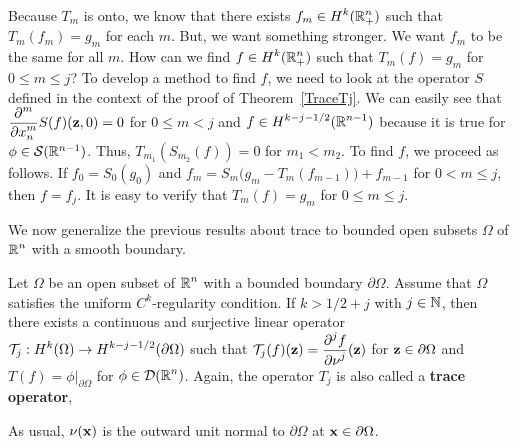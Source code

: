 Because $T_m$ is onto, we know that there exists
$\displaystyle f_m \in H^k(\RR^n_+)$ such that $\displaystyle T_m(f_m) = g_m$
for each $m$.  But, we want something stronger.  We want $f_m$ to be
the same for all $m$.  How can we find $\displaystyle f \in H^k(\RR^n_+)$ such
that $\displaystyle T_m(f) = g_m$ for $0 \leq m \leq j$?  To develop a
method to find $f$, we need to look at the operator $S$ defined in the
context of the proof of Theorem~\ref{TraceTj}.  We can easily see that
$\displaystyle \pdfdxn{S(f)}{x_n}{m}(\VEC{z},0) = 0$ for $0 \leq m < j$
and $\displaystyle f \in H^{k-j-1/2}(\RR^{n-1})$ because it is true
for $\phi \in \SS(\RR^{n-1})$.
Thus, $T_{m_1}(S_{m_2}(f)) = 0$ for $m_1 < m_2$.  To find $f$, we
proceed as follows. If $f_0 = S_0(g_0)$ and
$f_m = S_m\big(g_m - T_m(f_{m-1})\big) + f_{m-1}$ for $0 < m \leq j$,
then $f = f_j$.  It is easy to verify that $T_m(f) = g_m$ for
$0 \leq m \leq j$.

We now generalize the previous results about trace to bounded open
subsets $\Omega$ of $\displaystyle \RR^n$ with a smooth boundary.

\begin{theorem} \label{TraceTjOmega}
Let $\Omega$ be an open subset of $\displaystyle \RR^n$ with a bounded boundary
$\partial \Omega$.  Assume that $\Omega$ satisfies the uniform
$\displaystyle C^k$-regularity condition.  If $k > 1/2 +j$ with
$j \in \NN$, then there exists a continuous and surjective linear operator
$\displaystyle \TT_j:H^k(\Omega) \to H^{k-j-1/2}(\partial \Omega)$ such
that $\displaystyle \TT_j(f)(\VEC{z}) = \pdydxn{f}{\nu}{j}(\VEC{z})$ for
$\VEC{z} \in \partial \Omega$ and
$\displaystyle T(f) = \phi\big|_{\partial \Omega}$ for
$\displaystyle \phi \in \DD(\RR^n)$.
Again, the operator $T_j$ is also called a
{\bfseries trace operator},
\end{theorem}

\begin{rmk}
As usual, $\nu(\VEC{x})$ is the outward unit normal to $\partial \Omega$ at
$\VEC{x} \in \partial \Omega$.
\end{rmk}

